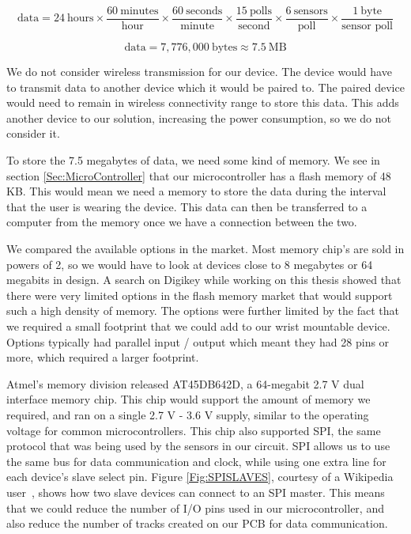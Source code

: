 \begin{equation}
\label{Eqn:DataAmount}
 \mbox{data} = 24~\mbox{hours} \times \dfrac{60~\mbox{minutes}}{\mbox{hour}} \times \dfrac{60~\mbox{seconds}}{\mbox{minute}} \times \dfrac{15~\mbox{polls}}{\mbox{second}} \times \dfrac{6~\mbox{sensors}}{\mbox{poll}} \times \dfrac{1~\mbox{byte}}{\mbox{sensor~poll}}
\end{equation}

\begin{equation}
\label{Eqn:DataAmount2}
\mbox{data} = 7,776,000~\mbox{bytes} \approx 7.5~\mbox{MB}
\end{equation}

We do not consider wireless transmission for our device. The device would have to transmit data to another device which it would be paired to. The paired device would need to remain in wireless connectivity range to store this data. This adds another device to our solution, increasing the power consumption, so we do not consider it.

To store the 7.5 megabytes of data, we need some kind of memory. We see in section \ref{Sec:MicroController} that our microcontroller has a flash memory of 48 KB. This would mean we need a memory to store the data during the interval that the user is wearing the device. This data can then be transferred to a computer from the memory once we have a connection between the two.

We compared the available options in the market. Most memory chip's are sold in powers of 2, so we would have to look at devices close to 8 megabytes or 64 megabits in design.
A search on Digikey \cite{Web:DigiKeyWebsite} while working on this thesis showed that there were very limited options in the flash memory market that would support such a high density of memory. The options were further limited by the fact that we required a small footprint that we could add to our wrist mountable device. Options typically had parallel input / output which meant they had 28 pins or more, which required a larger footprint.

Atmel's memory division released AT45DB642D,
a 64-megabit 2.7 V dual interface memory chip.
This chip would support the amount of memory we required, and ran on a single 2.7 V - 3.6 V supply,
similar to the operating voltage for common microcontrollers.
This chip also supported SPI, the same protocol that was being used by the sensors in our circuit.
SPI allows us to use the same bus for data communication and clock,
while using one extra line for each device's slave select pin.
Figure \ref{Fig:SPISLAVES}, courtesy of a Wikipedia user~\cite{Web:WikiCBurnett},
shows how two slave devices can connect to an SPI master.
This means that we could reduce the number of I/O pins used in our microcontroller,
and also reduce the number of tracks created on our PCB for data communication.

